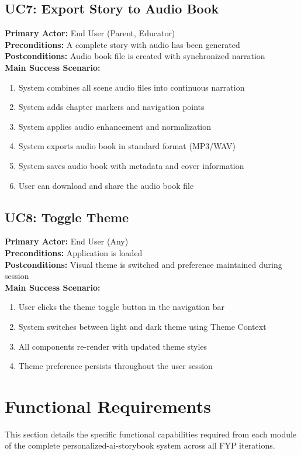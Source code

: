 \subsection{UC7: Export Story to Audio Book}
\textbf{Primary Actor:} End User (Parent, Educator)\\
\textbf{Preconditions:} A complete story with audio has been generated\\
\textbf{Postconditions:} Audio book file is created with synchronized narration\\
\textbf{Main Success Scenario:}
\begin{enumerate}
    \item System combines all scene audio files into continuous narration
    \item System adds chapter markers and navigation points
    \item System applies audio enhancement and normalization
    \item System exports audio book in standard format (MP3/WAV)
    \item System saves audio book with metadata and cover information
    \item User can download and share the audio book file
\end{enumerate}

\subsection{UC8: Toggle Theme}
\textbf{Primary Actor:} End User (Any)\\
\textbf{Preconditions:} Application is loaded\\
\textbf{Postconditions:} Visual theme is switched and preference maintained during session\\
\textbf{Main Success Scenario:}
\begin{enumerate}
    \item User clicks the theme toggle button in the navigation bar
    \item System switches between light and dark theme using Theme Context
    \item All components re-render with updated theme styles
    \item Theme preference persists throughout the user session
\end{enumerate}

\section{Functional Requirements}
This section details the specific functional capabilities required from each module of the complete personalized-ai-storybook system across all FYP iterations.

